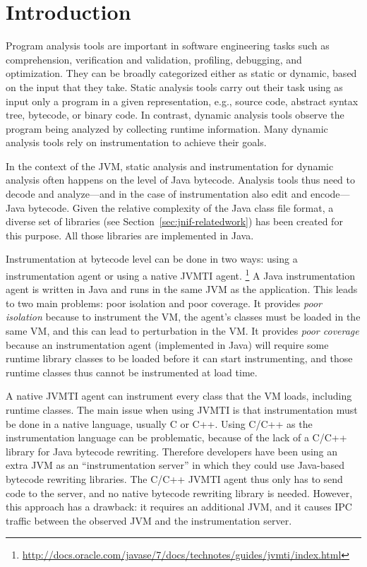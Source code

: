\section{Introduction}
\label{sec:jnif-introduction}

Program analysis tools are important in software engineering tasks 
such as comprehension, verification and validation, profiling, debugging, and optimization.
They can be broadly categorized either as static or dynamic, based on the input that they take.
Static analysis tools carry out their task using as input only a program in a given representation, 
e.g., source code, abstract syntax tree, bytecode, or binary code.
In contrast, dynamic analysis tools observe the program being analyzed 
by collecting runtime information.
Many dynamic analysis tools rely on instrumentation to achieve their goals.

In the context of the JVM, 
static analysis and instrumentation for dynamic analysis often happens on the level of Java bytecode.
Analysis tools thus need to decode and analyze---and in the case of instrumentation also edit and encode---Java bytecode.
Given the relative complexity of the Java class file format,
a diverse set of libraries (see Section~\ref{sec:jnif-relatedwork}) has been created for this purpose.
All those libraries are implemented in Java.

Instrumentation at bytecode level can be done in two ways:
using a \java{} instrumentation agent or using a native JVMTI agent.%
\footnote{\url{http://docs.oracle.com/javase/7/docs/technotes/guides/jvmti/index.html}}
A Java instrumentation agent is written in Java and runs in the same JVM as the application.
This leads to two main problems: poor isolation and poor coverage.
It provides \emph{poor isolation} because to instrument the VM, 
the agent's classes must be loaded in the same VM,
and this can lead to perturbation in the VM.
It provides \emph{poor coverage} because 
an instrumentation agent (implemented in Java) will require some runtime library classes to be loaded before it can start instrumenting,
and those runtime classes thus cannot be instrumented at load time. 

A native JVMTI agent can instrument every class that the VM loads, including runtime classes. 
The main issue when using JVMTI is that instrumentation must be done in a native language, usually C or C++. 
Using C/C++ as the instrumentation language can be problematic, 
because of the lack of a C/C++ library for Java bytecode rewriting. 
Therefore developers have been using an extra JVM as an ``instrumentation server''
in which they could use Java-based bytecode rewriting libraries.
The C/C++ JVMTI agent thus only has to send code to the server,
and no native bytecode rewriting library is needed.
However, this approach has a drawback: it requires an additional JVM, 
and it causes IPC traffic between the observed JVM and the instrumentation server.

